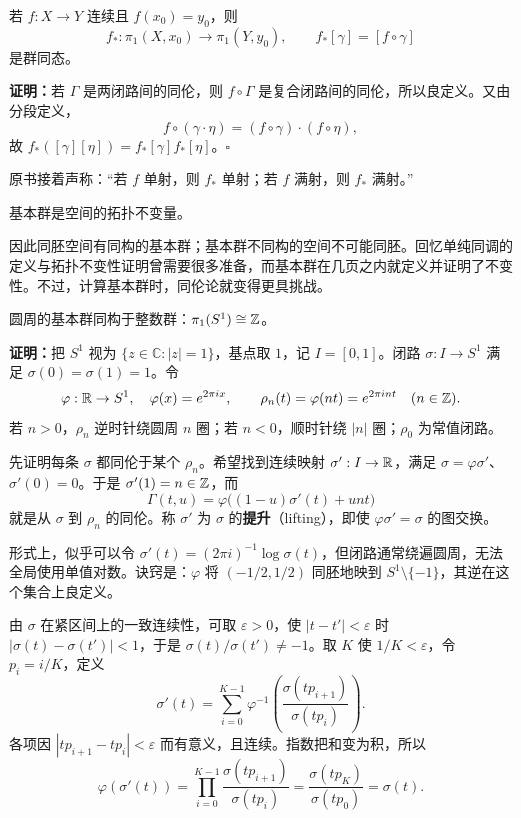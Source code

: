 若 $f:X\to Y$ 连续且 $f(x_0)=y_0$，则
\[
f_*:\pi_1(X,x_0)\to\pi_1(Y,y_0),\qquad f_*[\gamma]=[f\circ\gamma]
\]
是群同态。

\textbf{证明：}若 $\Gamma$ 是两闭路间的同伦，则 $f\circ\Gamma$ 是复合闭路间的同伦，所以良定义。又由分段定义，
\[
f\circ(\gamma\cdot\eta)=(f\circ\gamma)\cdot(f\circ\eta),
\]
故 $f_*([\gamma][\eta])=f_*[\gamma]f_*[\eta]$。\hfill$\square$

原书接着声称：“若 $f$ 单射，则 $f_*$ 单射；若 $f$ 满射，则 $f_*$ 满射。”

基本群是空间的拓扑不变量。

因此同胚空间有同构的基本群；基本群不同构的空间不可能同胚。回忆单纯同调的定义与拓扑不变性证明曾需要很多准备，而基本群在几页之内就定义并证明了不变性。不过，计算基本群时，同伦论就变得更具挑战。

圆周的基本群同构于整数群：$\pi_1(S^1)\cong\mathbb{Z}$。

\textbf{证明：}把 $S^1$ 视为 $\{z\in\mathbb C:|z|=1\}$，基点取 $1$，记 $I=[0,1]$。闭路 $\sigma:I\to S^1$ 满足 $\sigma(0)=\sigma(1)=1$。令
\[
\varphi:\mathbb{R}\to S^1,\quad\varphi(x)=e^{2\pi ix},\qquad
\rho_n(t)=\varphi(nt)=e^{2\pi int}\quad(n\in\mathbb{Z}).
\]
若 $n>0$，$\rho_n$ 逆时针绕圆周 $n$ 圈；若 $n<0$，顺时针绕 $|n|$ 圈；$\rho_0$ 为常值闭路。

先证明每条 $\sigma$ 都同伦于某个 $\rho_n$。希望找到连续映射 $\sigma':I\to\mathbb{R}$，满足 $\sigma=\varphi\sigma'$、$\sigma'(0)=0$。于是 $\sigma'(1)=n\in\mathbb{Z}$，而
\[
\Gamma(t,u)=\varphi\bigl((1-u)\sigma'(t)+unt\bigr)
\]
就是从 $\sigma$ 到 $\rho_n$ 的同伦。称 $\sigma'$ 为 $\sigma$ 的\textbf{提升}（lifting），即使 $\varphi\sigma'=\sigma$ 的图交换。

形式上，似乎可以令 $\sigma'(t)=(2\pi i)^{-1}\log\sigma(t)$，但闭路通常绕遍圆周，无法全局使用单值对数。诀窍是：$\varphi$ 将 $(-1/2,1/2)$ 同胚地映到 $S^1\setminus\{-1\}$，其逆在这个集合上良定义。

由 $\sigma$ 在紧区间上的一致连续性，可取 $\varepsilon>0$，使 $|t-t'|<\varepsilon$ 时 $|\sigma(t)-\sigma(t')|<1$，于是 $\sigma(t)/\sigma(t')\ne-1$。取 $K$ 使 $1/K<\varepsilon$，令 $p_i=i/K$，定义
\[
\sigma'(t)=\sum_{i=0}^{K-1}\varphi^{-1}\left(\frac{\sigma(tp_{i+1})}{\sigma(tp_i)}\right).
\]
各项因 $|tp_{i+1}-tp_i|<\varepsilon$ 而有意义，且连续。指数把和变为积，所以
\[
\varphi(\sigma'(t))=\prod_{i=0}^{K-1}\frac{\sigma(tp_{i+1})}{\sigma(tp_i)}
=\frac{\sigma(tp_K)}{\sigma(tp_0)}=\sigma(t).
\]

